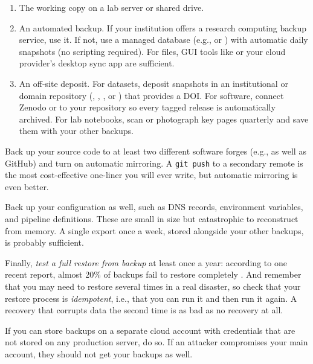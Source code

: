 \documentclass[10pt,letterpaper]{article}
\begin{document}
\begin{enumerate}
\item
  The working copy on a lab server or shared drive.
\item
  An automated backup. If your institution offers a research computing backup
  service, use it. If not, use a managed database (e.g., 
  or ) with automatic
  daily snapshots (no scripting required). For files, GUI tools like
   or your cloud provider's desktop
  sync app are sufficient.
\item
  An off-site deposit. For datasets, deposit snapshots in an institutional or
  domain repository (,
  ,
  , or ) that
  provides a DOI. For software, connect Zenodo or
   to your repository so every tagged
  release is automatically archived. For lab notebooks, scan or photograph key
  pages quarterly and save them with your other backups.
\end{enumerate}

Back up your source code to at least two different software forges (e.g.,
 as well as GitHub) and turn on automatic
mirroring. A \texttt{git push} to a secondary remote is the most cost-effective
one-liner you will ever write, but automatic mirroring is even better.

Back up your configuration as well, such as DNS records, environment variables,
and pipeline definitions. These are small in size but catastrophic to
reconstruct from memory. A single export once a week, stored alongside your
other backups, is probably sufficient.

Finally, \emph{test a full restore from backup} at least once a year: according
to one recent report, almost 20\% of backups fail to restore completely
\cite{backblaze2024}.  And remember that you may need to restore several times
in a real disaster, so check that your restore process is \emph{idempotent},
i.e., that you can run it and then run it again.  A recovery that corrupts data
the second time is as bad as no recovery at all.

\begin{notebox}
  If you can store backups on a separate cloud account with credentials that are
  not stored on any production server, do so. If an attacker compromises your main
  account, they should not get your backups as well.
\end{notebox}
\end{document}
